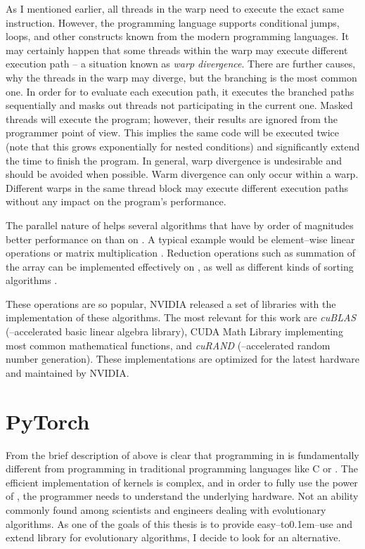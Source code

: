 As I mentioned earlier, all threads in the warp need to execute the exact same instruction. However, the programming language supports conditional jumps, loops, and other constructs known from the modern programming languages. It may certainly happen that some threads within the warp may execute different execution path -- a situation known as \emph{warp divergence}. There are further causes, why the threads in the warp may diverge, but the branching is the most common one. In order for \gpu to evaluate each execution path, it executes the branched paths sequentially and masks out threads not participating in the current one. Masked threads will execute the program; however, their results are ignored from the programmer point of view. This implies the same code will be executed twice (note that this grows exponentially for nested conditions) and significantly extend the time to finish the program. In general, warp divergence is undesirable and should be avoided when possible.
Warm divergence can only occur within a warp. Different warps in the same thread block may execute different execution paths without any impact on the program's performance.

The parallel nature of \cuda helps several algorithms that have by order of magnitudes better performance on \gpu than on \cpuns. A typical example would be element--wise linear operations or matrix multiplication \citep{GPUMatrixMultiplication}. Reduction operations such as summation of the array can be implemented effectively on \gpu \citep{harris2007optimizing}, as well as different kinds of sorting algorithms \citep{GPUsorting}.

These operations are so popular, NVIDIA released a set of libraries with the implementation of these algorithms. The most relevant for this work are \textit{cuBLAS} (\gpuns--accelerated basic linear algebra library), CUDA Math Library implementing most common mathematical functions, and \textit{cuRAND} (\cpuns--accelerated random number generation). These implementations are optimized for the latest hardware and maintained by NVIDIA.




\section{PyTorch}

From the brief description of \cuda above is clear that programming in \cuda is fundamentally different from programming in traditional programming languages like C or \cppns. The efficient implementation of kernels is complex, and in order to fully use the power of \gpuns, the programmer needs to understand the underlying hardware. Not an ability commonly found among scientists and engineers dealing with evolutionary algorithms. As one of the goals of this thesis is to provide easy--to\kern0.1em--use and extend library for evolutionary algorithms, I decide to look for an alternative.

